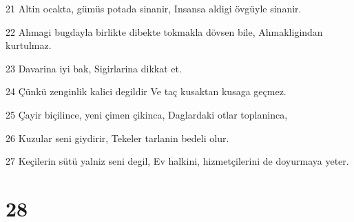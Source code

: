 \par 21 Altin ocakta, gümüs potada sinanir, Insansa aldigi övgüyle sinanir.
\par 22 Ahmagi bugdayla birlikte dibekte tokmakla dövsen bile, Ahmakligindan kurtulmaz.
\par 23 Davarina iyi bak, Sigirlarina dikkat et.
\par 24 Çünkü zenginlik kalici degildir Ve taç kusaktan kusaga geçmez.
\par 25 Çayir biçilince, yeni çimen çikinca, Daglardaki otlar toplaninca,
\par 26 Kuzular seni giydirir, Tekeler tarlanin bedeli olur.
\par 27 Keçilerin sütü yalniz seni degil, Ev halkini, hizmetçilerini de doyurmaya yeter.

\chapter{28}

